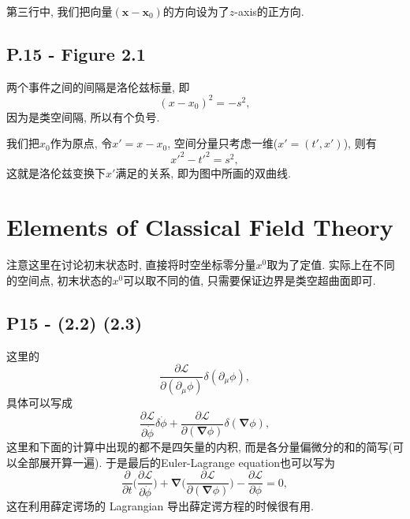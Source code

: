\documentclass[10pt,b5paper,openany]{book}
\begin{document}
第三行中, 我们把向量$(\mathbf{x}-\mathbf{x}_0)$的方向设为了$z$-axis的正方向. 

\subsection{P.15 - Figure 2.1}

两个事件之间的间隔是洛伦兹标量, 即
\begin{equation}
  (x-x_0)^2 = -s^2,
\end{equation}
因为是类空间隔, 所以有个负号. 

我们把$x_0$作为原点, 令$x'=x-x_0$, 空间分量只考虑一维($x'=(t',x')$), 则有
\begin{equation}
  x'^2-t'^2=s^2,
\end{equation}
这就是洛伦兹变换下$x'$满足的关系, 即为图中所画的双曲线. 

\section{Elements of Classical Field Theory}

注意这里在讨论初末状态时, 直接将时空坐标零分量$x^0$取为了定值. 实际上在不同的空间点, 初末状态的$x^0$可以取不同的值, 只需要保证边界是类空超曲面即可. 

\begin{center}
\end{center}

\subsection{P15 - (2.2) (2.3)}

这里的
\begin{equation}
  \frac{\partial \mathcal{L}}{\partial(\partial_\mu \phi)}\delta(\partial_\mu \phi),
\end{equation}
具体可以写成
\begin{equation}
  \frac{\partial \mathcal{L}}{\partial\dot\phi}\delta  \dot{\phi}+\frac{\partial \mathcal{L}}{\partial(\boldsymbol{\nabla} \phi)}\delta(\boldsymbol{\nabla} \phi),
\end{equation}
这里和下面的计算中出现的都不是四矢量的内积, 而是各分量偏微分的和的简写(可以全部展开算一遍). 于是最后的Euler-Lagrange equation也可以写为
\begin{equation}
  \frac{\partial}{\partial t}\biggl(\frac{\partial \mathcal{L}}{\partial\dot\phi}\biggr) + \boldsymbol{\nabla} \biggl(\frac{\partial \mathcal{L}}{\partial(\boldsymbol{\nabla} \phi)}\biggr) - \frac{\partial \mathcal{L}}{\partial \phi} = 0,
\end{equation}
这在利用薛定谔场的 Lagrangian 导出薛定谔方程的时候很有用. 
\end{document}
